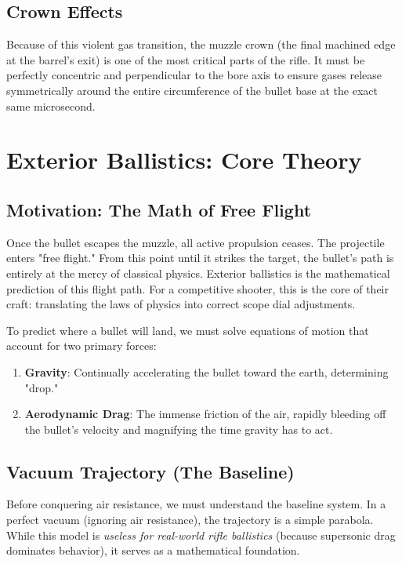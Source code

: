 \documentclass[11pt,twoside,openright]{report}
\begin{document}
\section{Crown Effects}

Because of this violent gas transition, the muzzle crown (the final machined edge at the barrel's exit) is one of the most critical parts of the rifle. It must be perfectly concentric and perpendicular to the bore axis to ensure gases release symmetrically around the entire circumference of the bullet base at the exact same microsecond.


\chapter{Exterior Ballistics: Core Theory}
\label{ch:exterior}

\section{Motivation: The Math of Free Flight}

Once the bullet escapes the muzzle, all active propulsion ceases. The projectile enters "free flight." From this point until it strikes the target, the bullet's path is entirely at the mercy of classical physics. Exterior ballistics is the mathematical prediction of this flight path. For a competitive shooter, this is the core of their craft: translating the laws of physics into correct scope dial adjustments.

To predict where a bullet will land, we must solve equations of motion that account for two primary forces:
\begin{enumerate}
    \item \textbf{Gravity}: Continually accelerating the bullet toward the earth, determining "drop."
    \item \textbf{Aerodynamic Drag}: The immense friction of the air, rapidly bleeding off the bullet's velocity and magnifying the time gravity has to act.
\end{enumerate}

\section{Vacuum Trajectory (The Baseline)}

Before conquering air resistance, we must understand the baseline system. In a perfect vacuum (ignoring air resistance), the trajectory is a simple parabola. While this model is \emph{useless for real-world rifle ballistics} (because supersonic drag dominates behavior), it serves as a mathematical foundation. 
\end{document}
